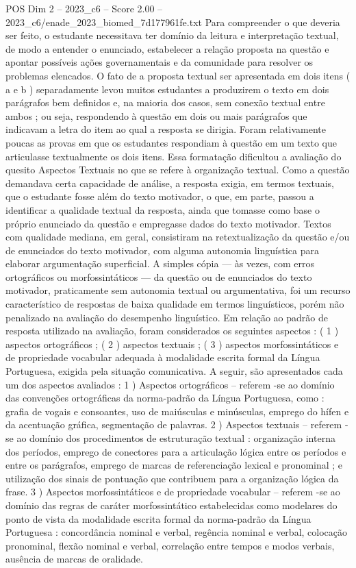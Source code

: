 \begin{textsample}{POS Dim 2 – 2023\_c6 – Score 2.00 – 2023\_c6/enade\_2023\_biomed\_7d177961fe.txt}
Para compreender o que deveria ser feito, o estudante necessitava ter domínio da leitura e interpretação textual, de modo a entender o enunciado, estabelecer a relação proposta na questão e apontar possíveis ações governamentais e da comunidade para resolver os problemas elencados.
O fato de a proposta textual ser apresentada em dois itens ( a e b ) separadamente levou muitos estudantes a produzirem o texto em dois parágrafos bem definidos e, na maioria dos casos, sem conexão textual entre ambos ; ou seja, respondendo à questão em dois ou mais parágrafos que indicavam a letra do item ao qual a resposta se dirigia.
Foram relativamente poucas as provas em que os estudantes respondiam à questão em um texto que articulasse textualmente os dois itens.
Essa formatação dificultou a avaliação do quesito Aspectos Textuais no que se refere à organização textual.
Como a questão demandava certa capacidade de análise, a resposta exigia, em termos textuais, que o estudante fosse além do texto motivador, o que, em parte, passou a identificar a qualidade textual da resposta, ainda que tomasse como base o próprio enunciado da questão e empregasse dados do texto motivador.
Textos com qualidade mediana, em geral, consistiram na retextualização da questão e/ou de enunciados do texto motivador, com alguma autonomia linguística para elaborar argumentação superficial.
A simples cópia — às vezes, com erros ortográficos ou morfossintáticos — da questão ou de enunciados do texto motivador, praticamente sem autonomia textual ou argumentativa, foi um recurso característico de respostas de baixa qualidade em termos linguísticos, porém não penalizado na avaliação do desempenho linguístico.
Em relação ao padrão de resposta utilizado na avaliação, foram considerados os seguintes aspectos : ( 1 ) aspectos ortográficos ; ( 2 ) aspectos textuais ; ( 3 ) aspectos morfossintáticos e de propriedade vocabular adequada à modalidade escrita formal da Língua Portuguesa, exigida pela situação comunicativa.
A seguir, são apresentados cada um dos aspectos avaliados : 1 ) Aspectos ortográficos – referem -se ao domínio das convenções ortográficas da norma-padrão da Língua Portuguesa, como : grafia de vogais e consoantes, uso de maiúsculas e minúsculas, emprego do hífen e da acentuação gráfica, segmentação de palavras. 2 ) Aspectos textuais – referem -se ao domínio dos procedimentos de estruturação textual : organização interna dos períodos, emprego de conectores para a articulação lógica entre os períodos e entre os parágrafos, emprego de marcas de referenciação lexical e pronominal ; e utilização dos sinais de pontuação que contribuem para a organização lógica da frase. 3 ) Aspectos morfossintáticos e de propriedade vocabular – referem -se ao domínio das regras de caráter morfossintático estabelecidas como modelares do ponto de vista da modalidade escrita formal da norma-padrão da Língua Portuguesa : concordância nominal e verbal, regência nominal e verbal, colocação pronominal, flexão nominal e verbal, correlação entre tempos e modos verbais, ausência de marcas de oralidade.

\end{textsample}

